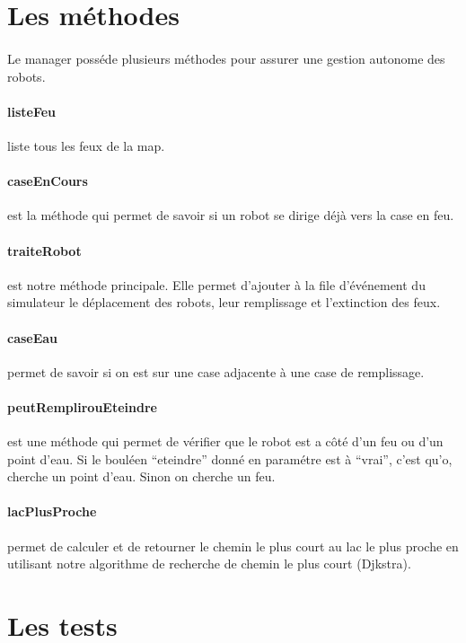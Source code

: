 \documentclass[10pt]{report}
\begin{document}
\section{Les méthodes}
\paragraph{}Le manager posséde plusieurs méthodes pour assurer une gestion autonome des robots.\\
\paragraph{listeFeu}liste tous les feux de la map.\\
\paragraph{caseEnCours}est la méthode qui permet de savoir si un robot se dirige déjà vers la case en feu.\\
\paragraph{traiteRobot}est notre méthode principale. Elle permet d'ajouter à la file d'événement du simulateur le déplacement des robots, leur remplissage et l'extinction des feux.\\
\paragraph{caseEau}permet de savoir si on est sur une case adjacente à une case de remplissage.\\
\paragraph{peutRemplirouEteindre}est une méthode qui permet de vérifier que le robot est a côté d'un feu ou d'un point d'eau. Si le bouléen ``eteindre'' donné en paramétre est à ``vrai'', c'est qu'o, cherche un point d'eau. Sinon on cherche un feu.\\
\paragraph{lacPlusProche}permet de calculer et de retourner le chemin le plus court au lac le plus proche en utilisant notre algorithme de recherche de chemin le plus court (Djkstra).


\section{Les tests}
\end{document}
